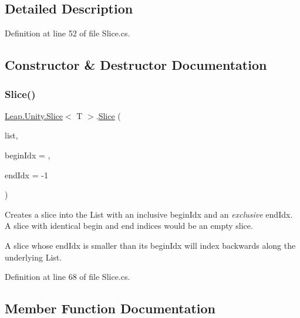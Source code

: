 \subsection{Detailed Description}


Definition at line 52 of file Slice.\+cs.



\subsection{Constructor \& Destructor Documentation}
\mbox{\label{struct_leap_1_1_unity_1_1_slice_a269ca2618c7a7d3bb7f92e6109442fbd}} 
\subsubsection{\texorpdfstring{Slice()}{Slice()}}
{\footnotesize\ttfamily \mbox{\hyperlink{struct_leap_1_1_unity_1_1_slice}{Leap.\+Unity.\+Slice}}$<$ T $>$.\mbox{\hyperlink{struct_leap_1_1_unity_1_1_slice}{Slice}} (\begin{DoxyParamCaption}\item[{I\+List$<$ T $>$}]{list,  }\item[{int}]{begin\+Idx = {},  }\item[{int}]{end\+Idx = {\ttfamily -\/1} }\end{DoxyParamCaption})}



Creates a slice into the List with an inclusive begin\+Idx and an {\itshape exclusive} end\+Idx. A slice with identical begin and end indices would be an empty slice. 

A slice whose end\+Idx is smaller than its begin\+Idx will index backwards along the underlying List. 

Definition at line 68 of file Slice.\+cs.



\subsection{Member Function Documentation}
\mbox{\label{struct_leap_1_1_unity_1_1_slice_a19537a9776f32b8ea888b96bfaa7f8e7}} 
